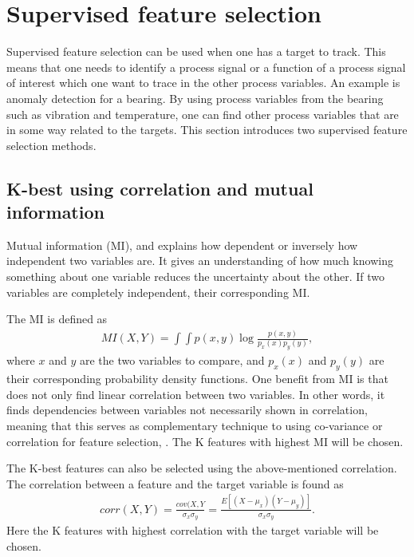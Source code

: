 \section{Supervised feature selection}\label{sec:sup_feat_select}
    Supervised feature selection can be used when one has a target to track. This means that one needs to identify a process signal or a function of a process signal of interest which one want to trace in the other process variables. An example is anomaly detection for a bearing. By using process variables from the bearing such as vibration and temperature, one can find other process variables that are in some way related to the targets. This section introduces two supervised feature selection methods. 
    
    
    \subsection{K-best using correlation and  mutual information}\label{subsec:K-best_feat_select}
    
        Mutual information (MI), \cite{Kraskov2004} and \cite{Peng2005} explains how dependent or inversely how independent two variables are. It gives an understanding of how much knowing something about one variable reduces the uncertainty about the other. If two variables are completely independent, their corresponding MI. 
        
        The MI is defined as
        \begin{align}\label{eq:tech_MI}
                MI(X,Y) = \int \int p(x,y) \log \frac{p(x,y)}{p_x(x)p_y(y)},
        \end{align}
        where $x$ and $y$ are the two variables to compare, and $p_x(x)$ and $p_y(y)$ are their corresponding probability density functions. One benefit from MI is that does not only find linear correlation between two variables. In other words, it finds dependencies between variables not necessarily shown in correlation, meaning that this serves as complementary technique to using co-variance or correlation for feature selection, \cite{Li}. The K features with highest MI will be chosen. 
        
        
        The K-best features can also be selected using the above-mentioned correlation. The correlation between a feature and the target variable is found as  
        \begin{align}
            corr(X,Y) = \frac{cov(X,Y}{\sigma_x\sigma_y} = \frac{E[(X-\mu_x)(Y-\mu_y)]}{\sigma_x\sigma_y}.
        \end{align}
        Here the K features with highest correlation with the target variable will be chosen. 
        
